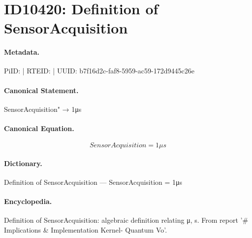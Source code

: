 \section*{ID10420: Definition of SensorAcquisition}
\paragraph{Metadata.}
PiID:  | RTEID:  | UUID: b7f16d2c-faf8-5959-ac59-172d9445c26e

\paragraph{Canonical Statement.}
SensorAcquisition" → 1μs

\paragraph{Canonical Equation.}
\[
SensorAcquisition = 1μs
\]

\paragraph{Dictionary.}
Definition of SensorAcquisition — SensorAcquisition = 1μs

\paragraph{Encyclopedia.}
Definition of SensorAcquisition: algebraic definition relating μ, s. From report '\# Implications \& Implementation Kernel- Quantum Vo'.

